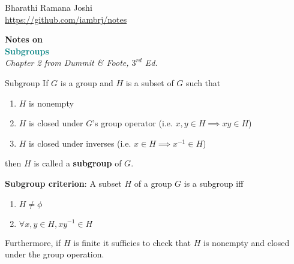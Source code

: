 \documentclass[titlepage, 12pt]{article}
\begin{document}
\begin{titlepage} %

	\raggedleft%

	\vspace*{\baselineskip} %

	{Bharathi Ramana Joshi\\\url{https://github.com/iambrj/notes}} %

	\vspace*{0.167\textheight} %

	\textbf{\LARGE Notes on}\\[\baselineskip] %

	\textbf{\textcolor{teal}{\huge Subgroups}}\\[\baselineskip] %

    {\Large \textit{Chapter 2 from Dummit \& Foote, $3^{rd}$ Ed.}} %

	\vfill %

	\vspace*{3\baselineskip} %

\end{titlepage}

\begin{definition}{Subgroup}{}
    If $G$ is a group and $H$ is a subset of $G$ such that
    \begin{enumerate}
        \item $H$ is nonempty
        \item $H$ is closed under $G$'s group operator (i.e. $x, y\in H\implies
            xy\in H$)
        \item $H$ is closed under inverses (i.e. $x\in H \implies x^{-1} \in H$)
    \end{enumerate}
    then $H$ is called a \textbf{subgroup} of $G$.
\end{definition}

\textbf{Subgroup criterion}: A subset $H$ of a group $G$ is a subgroup iff
\begin{enumerate}
    \item $H\neq\phi$
    \item $\forall x, y\in H, xy^{-1}\in H$
\end{enumerate}
Furthermore, if $H$ is finite it sufficies to check that $H$ is nonempty and
closed under the group operation.
\end{document}
